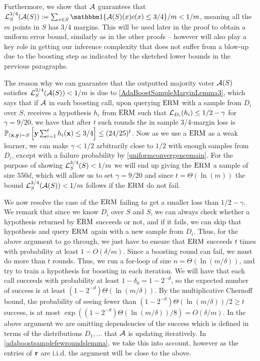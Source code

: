 Furthermore, we show that $ \mathcal{A} $ guarantees that $\ls_{S}^{3/4}(\cA(S)):= \sum_{x\in S} \ind\{\cA(S)(x)c(x)\leq 3/4 \}/m <1/m $, meaning all the $m$ points in $ S $  has $ 3/4 $  margins. This will be used later in the proof to obtain a uniform error bound, similarly as in the other proofs -- however will also play a key role in getting our inference complexity that does not suffer from a blow-up due to the boosting step as indicated by the sketched lower bounds in the previous paragraphs.

The reason why we can guarantee that the outputted majority voter $ \mathcal{A}(S) $ satisfies
$ \operatorname{\mathcal{L}}_{S}^{3/4}(\mathcal{A}(S)) <1/m $ is due to \cref{AdaBoostSampleMarginLemma3}, which says that if $ \mathcal{A} $ in each boosting call, upon querying $ \mathrm{ERM} $  with a sample from $ D_{i} $ over $ S $, receives a hypothesis $ h_{i} $ from $ \mathrm{ERM} $ such that  $ \operatorname{\mathcal{L}}_{D_{i}}(h_{i})\leq 1/2-\gamma  $ for $ \gamma=9/20 $,  we have that after $ t $ such rounds the in sample 3/4-margin loss is  $\mathbb{P}_{(\mathbf{x},\mathbf{y})\sim S}\left[\mathbf{y} \sum_{i=1}^{t} h_{i}(\mathbf{x})\leq 3/4 \right]\leq (24/25)^{t}$. Now as we use a $ \mathrm{ERM} $ as a weak learner, we can make $ \gamma <1/2$  arbitrarily close to $ 1/2 $  with enough samples from $ D_{i} $, except with a failure probability by \cref{uniformconvergencemain}. For the purpose of showing $ \operatorname{\mathcal{L}}_{S}^{3/4}(S)<1/{m} $ we will end up giving the $ \mathrm{ERM} $ a sample of size $ 550d $, which will allow us to set $ \gamma=9/20 $ and since $t= \Theta(\ln{\left(m\right)}) $ the bound $ \operatorname{\mathcal{L}}_{S}^{3/4}(\mathcal{A}(S))<1/m $ follows if the $ \mathrm{ERM} $ do not fail. 

We now resolve the case of the $ \mathrm{ERM} $ failing to get a smaller loss than $ 1/2-\gamma $. We remark that since we know $ D_{i} $ over $ S $ and $ S $, we can always check whether a hypothesis returned by $ \mathrm{ERM} $ succeeds or not, and if it fails, we can skip that hypothesis and query $ \mathrm{ERM} $ again with a new sample from $ D_{i}$. Thus, for the above argument to go through, we just have to ensure that $ \mathrm{ERM} $ succeeds $ t $  times with probability at least $ 1-O(\delta/m) $. Since a boosting round can fail, we must do more than $ t $ rounds. Thus, we 
run a for-loop of size $n= \Theta(\ln{\left(m/\delta\right)} )$, and try to train a hypothesis for boosting in each iteration.  We will have that each call succeeds with probability at least $1-\delta_{0}=1-2^{-d}$, so the expected number of success is at least $(1-2^{-d})\Theta(\ln{\left(m/\delta \right)} )$. By the multiplicative Chernoff bound, the probability of seeing fewer than $(1-2^{-d})\Theta(\ln{\left(m/\delta\right)} )/2 \geq t$ success, is at most $ \exp((1-2^{-d})\Theta(\ln{\left(m/\delta \right)} )/8)=O(\delta/m)$. In the above argument we are omitting dependencies of the success which is defined in terms of the distributions $ D_1,\ldots $  that $ \mathcal{A} $  is updating iteratively. In \cref{adaboostsamplefewroundslemma}, we take this into account, however as the entries of $ \mathbf{r} $ are i.i.d. the argument will be close to the above. 

